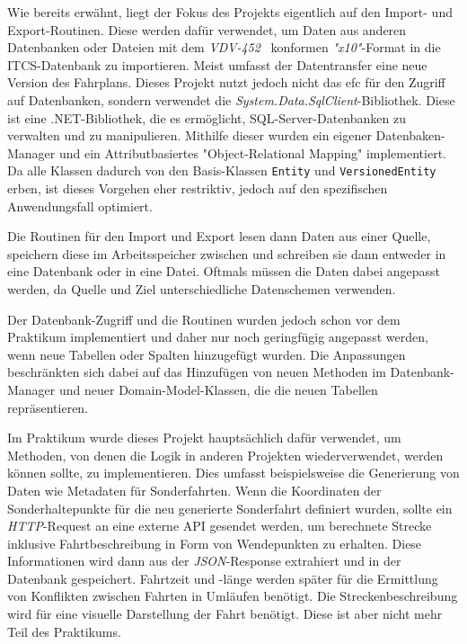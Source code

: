     Wie bereits erwähnt, liegt der Fokus des Projekts eigentlich auf den Import- und Export-Routinen. Diese werden dafür verwendet, um Daten aus anderen Datenbanken oder Dateien mit dem 
    \emph{VDV-452}~\cite{VDV452} konformen \emph{"x10"}-Format in die ITCS-Datenbank zu importieren. Meist umfasst der Datentransfer eine neue Version des Fahrplans.
    Dieses Projekt nutzt jedoch nicht das \gls{efc} für den Zugriff auf Datenbanken, sondern verwendet die \emph{System.Data.SqlClient}-Bibliothek.
    Diese ist eine .NET-Bibliothek, die es ermöglicht, SQL-Server-Datenbanken zu verwalten 
    und zu manipulieren. Mithilfe dieser wurden ein eigener Datenbaken-Manager und ein Attributbasiertes "Object-Relational Mapping" implementiert. Da alle Klassen dadurch von den 
    Basis-Klassen \texttt{Entity} und \texttt{VersionedEntity} erben, ist dieses Vorgehen eher restriktiv, jedoch auf den spezifischen Anwendungsfall optimiert.
    
    Die Routinen für den Import und Export lesen dann Daten aus einer Quelle, speichern diese im Arbeitsspeicher zwischen und schreiben sie dann entweder in eine Datenbank oder in eine Datei.
    Oftmals müssen die Daten dabei angepasst werden, da Quelle und Ziel unterschiedliche Datenschemen verwenden. 

    Der Datenbank-Zugriff und die Routinen wurden jedoch schon vor dem Praktikum implementiert und daher nur noch geringfügig angepasst werden, wenn neue Tabellen oder Spalten hinzugefügt wurden.
    Die Anpassungen beschränkten sich dabei auf das Hinzufügen von neuen Methoden im Datenbank-Manager und neuer Domain-Model-Klassen, die die neuen Tabellen repräsentieren.
    
    Im Praktikum wurde dieses Projekt hauptsächlich dafür verwendet, um Methoden, von denen die Logik in anderen Projekten wiederverwendet, werden können sollte, zu implementieren. 
    Dies umfasst beispielsweise die Generierung von Daten wie Metadaten für Sonderfahrten. Wenn die Koordinaten der Sonderhaltepunkte für die neu generierte Sonderfahrt definiert wurden,
    sollte ein \emph{HTTP}-Request an eine externe API gesendet werden, um berechnete Strecke inklusive Fahrtbeschreibung in Form von Wendepunkten zu erhalten. Diese 
    Informationen wird dann aus der \emph{JSON}-Response extrahiert und in der Datenbank gespeichert. Fahrtzeit und -länge werden 
    später für die Ermittlung von Konflikten zwischen Fahrten in Umläufen benötigt. Die Streckenbeschreibung wird für eine 
    visuelle Darstellung der Fahrt benötigt. Diese ist aber nicht mehr Teil des Praktikums.
